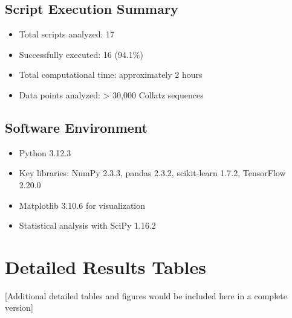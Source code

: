 \documentclass[12pt,a4paper]{article}
\begin{document}
\subsection{Script Execution Summary}
\begin{itemize}
\item Total scripts analyzed: 17
\item Successfully executed: 16 (94.1\%)
\item Total computational time: approximately 2 hours
\item Data points analyzed: > 30,000 Collatz sequences
\end{itemize}

\subsection{Software Environment}
\begin{itemize}
\item Python 3.12.3
\item Key libraries: NumPy 2.3.3, pandas 2.3.2, scikit-learn 1.7.2, TensorFlow 2.20.0
\item Matplotlib 3.10.6 for visualization
\item Statistical analysis with SciPy 1.16.2
\end{itemize}

\section{Detailed Results Tables}

[Additional detailed tables and figures would be included here in a complete version]
\end{document}
